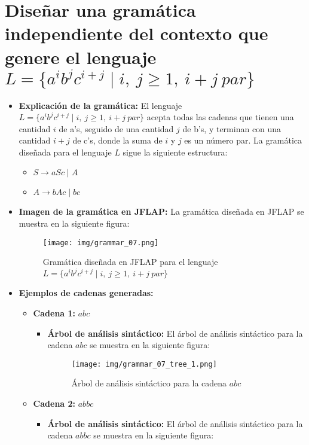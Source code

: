 \documentclass[11pt]{report}
\begin{document}
\section{Diseñar una gramática independiente del contexto que genere el lenguaje $L = \{a^i b^j c^{i+j} \mid i, \ j \geq 1, \ i + j \ par\}$}
\begin{itemize}
  \item \textbf{Explicación de la gramática:} El lenguaje $L = \{a^i b^j c^{i+j} \mid i, \ j \geq 1, \ i + j \ par\}$ acepta todas las cadenas que tienen una cantidad $i$ de a's, seguido de una cantidad $j$ de b's, y terminan con una cantidad $i + j$ de c's, donde la suma de $i$ y $j$ es un número par. La gramática diseñada para el lenguaje $L$ sigue la siguiente estructura:
  \begin{itemize}
    \item $S \rightarrow aSc \mid A$
    \item $A \rightarrow bAc \mid bc$
  \end{itemize}
  \item \textbf{Imagen de la gramática en JFLAP:} La gramática diseñada en JFLAP se muestra en la siguiente figura:
  \begin{figure}[H]
    \centering
    \texttt{[image: img/grammar\_07.png]}
    \caption{Gramática diseñada en JFLAP para el lenguaje $L = \{a^i b^j c^{i+j} \mid i, \ j \geq 1, \ i + j \ par\}$}
  \end{figure}
  \item \textbf{Ejemplos de cadenas generadas:}
  \begin{itemize}
    \item \textbf{Cadena 1:} $abc$
    \begin{itemize}
      \item \textbf{Árbol de análisis sintáctico:} El árbol de análisis sintáctico para la cadena $abc$ se muestra en la siguiente figura:
      \begin{figure}[H]
        \centering
        \texttt{[image: img/grammar\_07\_tree\_1.png]}
        \caption{Árbol de análisis sintáctico para la cadena $abc$}
        \label{fig:arbol19}
      \end{figure}
    \end{itemize}
    \item \textbf{Cadena 2:} $abbc$
    \begin{itemize}
      \item \textbf{Árbol de análisis sintáctico:} El árbol de análisis sintáctico para la cadena $abbc$ se muestra en la siguiente figura:

\end{itemize}
\end{itemize}
\end{itemize}
\end{document}
